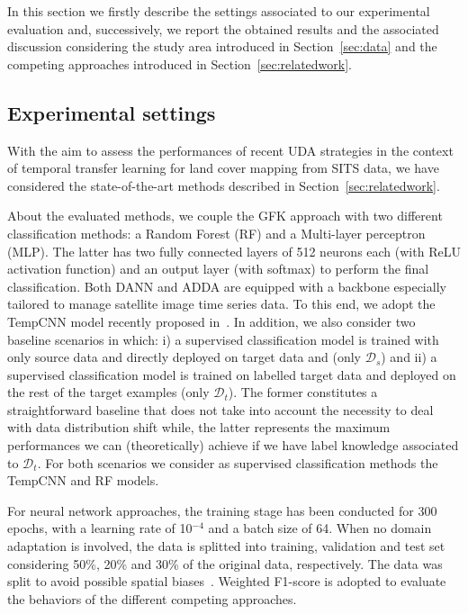 In this section we firstly describe the settings associated to our experimental evaluation and, successively, we report the obtained results and the associated discussion considering the study area introduced in Section~\ref{sec:data} and the competing approaches introduced in Section~\ref{sec:relatedwork}.

\subsection{Experimental settings}
\label{ssec:expe-settings}
With the aim to assess the performances of recent UDA strategies in the context of temporal transfer learning for land cover mapping from SITS data, we have considered the state-of-the-art methods described in Section~\ref{sec:relatedwork}.

About the evaluated methods, we couple the GFK approach with two different classification methods: a Random Forest (RF) and a Multi-layer perceptron (MLP). The latter has two fully connected layers of 512 neurons each (with ReLU activation function) and an output layer (with softmax) to perform the final classification. Both DANN and ADDA are equipped with a backbone especially tailored to manage satellite image time series data. To this end, we adopt the TempCNN model recently proposed in~\cite{Pelletier19}. In addition, we also consider two baseline scenarios in which: i) a supervised classification model is trained with only source data and directly deployed on target data and (only $\mathcal{D}_s$) and ii) a supervised classification model is trained on labelled target data and deployed on the rest of the target examples (only $\mathcal{D}_t$). The former constitutes a straightforward baseline that does not take into account the necessity to deal with data distribution shift while, the latter represents the maximum performances we can (theoretically) achieve if we have label knowledge associated to $\mathcal{D}_t$. For both scenarios we consider as supervised classification methods the TempCNN and RF models.

For neural network approaches, the training stage has been conducted for 300 epochs, with a learning rate of 10$^{-4}$ and a batch size of 64. 
When no domain adaptation is involved, the data is splitted into training, validation and test set considering 50\%, 20\% and 30\% of the original data, respectively. The data was split to avoid possible spatial biases~\cite{IENCO201911}. Weighted F1-score is adopted to evaluate the behaviors of the different competing approaches.

